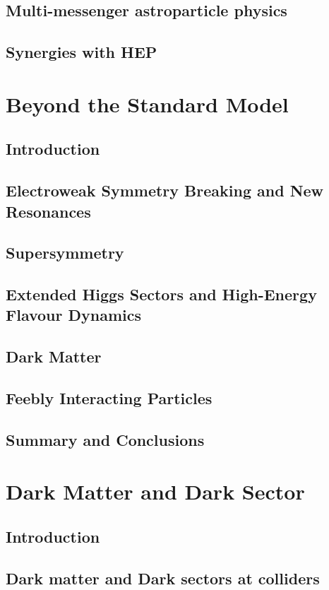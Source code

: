 \documentclass[../report.tex]{subfiles}
\begin{document}
\section{Multi-messenger astroparticle physics}
\section{Synergies with HEP}

\chapter{Beyond the Standard Model}
\section{Introduction}
\section{Electroweak Symmetry Breaking and New Resonances}
\section{Supersymmetry}
\section{Extended Higgs Sectors and High-Energy Flavour Dynamics}
\section{Dark Matter}
\section{Feebly Interacting Particles}
\section{Summary and Conclusions}

\chapter{Dark Matter and Dark Sector}
\section{Introduction}
\section{Dark matter and Dark sectors at colliders}
\end{document}
